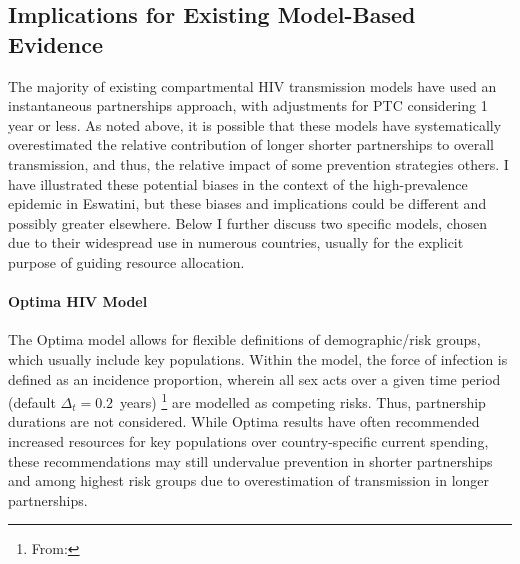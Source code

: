 \subsection{Implications for Existing Model-Based Evidence}\label{foi.disc.evid}
The majority of existing compartmental HIV transmission models
have used an instantaneous partnerships approach,
with adjustments for PTC considering 1 year or less.
As noted above, it is possible that these models have systematically overestimated
the relative contribution of longer \vs shorter partnerships to overall transmission,
and thus, the relative impact of some prevention strategies \vs others.
I have illustrated these potential biases
in the context of the high-prevalence epidemic in Eswatini,
but these biases and implications could be different and possibly greater elsewhere.
Below I further discuss two specific models,
chosen due to their widespread use in numerous countries,
usually for the explicit purpose of guiding resource allocation.
\paragraph{Optima HIV Model}\cite{Kerr2015,Stuart2018how,Kerr2020,Optima2021}
The Optima model allows for flexible definitions of demographic/risk groups,
which usually include key populations.
Within the model, the force of infection is defined as an incidence proportion,
wherein all sex acts over a given time period (default $\Delta_t = 0.2$~years)%
\footnote{From: }
are modelled as competing risks.
Thus, partnership durations are not considered.
While Optima results have often recommended
increased resources for key populations over country-specific current spending,
these recommendations may still undervalue
prevention in shorter partnerships and among highest risk groups
due to overestimation of transmission in longer partnerships.
